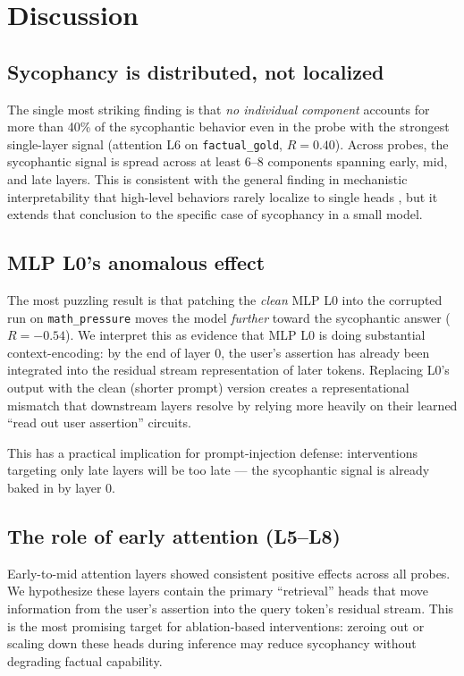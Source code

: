 \documentclass[10pt,letterpaper]{article}
\begin{document}
\section{Discussion}

\subsection{Sycophancy is distributed, not localized}

The single most striking finding is that \textit{no individual component} accounts for more than 40\% of the sycophantic behavior even in the probe with the strongest single-layer signal (attention L6 on \texttt{factual\_gold}, $R = 0.40$). Across probes, the sycophantic signal is spread across at least 6--8 components spanning early, mid, and late layers. This is consistent with the general finding in mechanistic interpretability that high-level behaviors rarely localize to single heads \cite{wang2022ioi,conmy2023acdc}, but it extends that conclusion to the specific case of sycophancy in a small model.

\subsection{MLP L0's anomalous effect}

The most puzzling result is that patching the \textit{clean} MLP L0 into the corrupted run on \texttt{math\_pressure} moves the model \textit{further} toward the sycophantic answer ($R = -0.54$). We interpret this as evidence that MLP L0 is doing substantial context-encoding: by the end of layer 0, the user's assertion has already been integrated into the residual stream representation of later tokens. Replacing L0's output with the clean (shorter prompt) version creates a representational mismatch that downstream layers resolve by relying more heavily on their learned ``read out user assertion'' circuits.

This has a practical implication for prompt-injection defense: interventions targeting only late layers will be too late — the sycophantic signal is already baked in by layer 0.

\subsection{The role of early attention (L5--L8)}

Early-to-mid attention layers showed consistent positive effects across all probes. We hypothesize these layers contain the primary ``retrieval'' heads that move information from the user's assertion into the query token's residual stream. This is the most promising target for ablation-based interventions: zeroing out or scaling down these heads during inference may reduce sycophancy without degrading factual capability.
\end{document}
